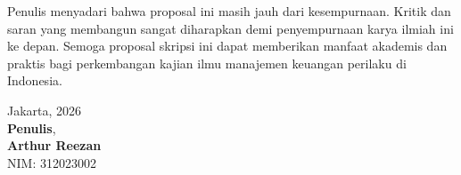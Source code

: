 \documentclass[12pt,a4paper]{article}
\numberwithin{equation}{section}
\numberwithin{table}{section}
\numberwithin{figure}{section}
\newcommand{\namamahasiswa}{Arthur Reezan}
\newcommand{\nim}{312023002}
\begin{document}
Penulis menyadari bahwa proposal ini masih jauh dari kesempurnaan. Kritik dan saran yang membangun sangat diharapkan demi penyempurnaan karya ilmiah ini ke depan. Semoga proposal skripsi ini dapat memberikan manfaat akademis dan praktis bagi perkembangan kajian ilmu manajemen keuangan perilaku di Indonesia.

\vspace{0.6cm}
\noindent
\hfill
\begin{minipage}[t]{5.5cm}
  Jakarta, \underline{\hspace{3.2cm}} 2026\\[0.25cm]
  \textbf{Penulis},\\[1.8cm]
  \textbf{\namamahasiswa}\\
  NIM: \nim
\end{minipage}
\end{document}
